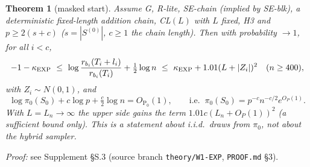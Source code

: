 \documentclass[11pt]{article}
\newtheorem{thmpart}{Theorem}[theorem]
\theoremstyle{definition}
\theoremstyle{remark}
\renewcommand{\Pr}{\mathrm{P}}
\newcommand{\Sz}{S_0}
\begin{document}
\begin{thmpart}[masked start]\label{thm:masked}
Assume G, R-lite, SE-chain (implied by SE-blk), a deterministic fixed-length addition chain, CL$(L)$ with $L$ fixed, H3 and
$p\ge2(s+c)$ ($s=|S^{(0)}|$, $c\ge1$ the chain length). Then with probability $\to1$, for all $i<c$,
\[
-1-\kappa_{\rm EXP}\ \le\ \log\frac{r_{b_i}(T_i+l_i)}{r_{b_i}(T_i)}+\tfrac12\log n\ \le\ \kappa_{\rm EXP}+1.01(L+|Z_i|)^2\quad(n\ge400),
\]
with $Z_i\sim N(0,1)$, and
\[
\log\pi_0(\Sz)+c\log p+\tfrac c2\log n=O_{\Pr_0}(1),\qquad\text{i.e. }\ \pi_0(\Sz)=p^{-c}n^{-c/2}e^{O_P(1)} .
\]
With $L=L_n\to\infty$ the upper side gains the term $1.01c(L_n+O_P(1))^2$ (a sufficient bound only). This is a statement about
i.i.d.\ draws from $\pi_0$, \emph{not} about the hybrid sampler.
\end{thmpart}
\noindent\emph{Proof:} see Supplement \S S.3 (source branch \texttt{theory/W1-EXP}, \texttt{PROOF.md} \S3).
\end{document}
